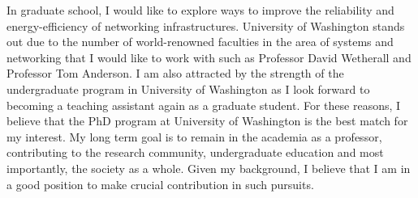 \documentclass[11pt]{article}
\begin{document}
In graduate school, I would like to explore ways to improve the reliability and energy-efficiency of networking infrastructures. University of Washington stands out due to the number of world-renowned faculties in the area of systems and networking that I would like to work with such as Professor David Wetherall and Professor Tom Anderson. I am also attracted by the strength of the undergraduate program in University of Washington as I look forward to becoming a teaching assistant again as a graduate student. For these reasons, I believe that the PhD program at University of Washington is the best match for my interest. My long term goal is to remain in the academia as a professor, contributing to the research community, undergraduate education and most importantly, the society as a whole. Given my background, I believe that I am in a good position to make crucial contribution in such pursuits. \newline



\end{document}
